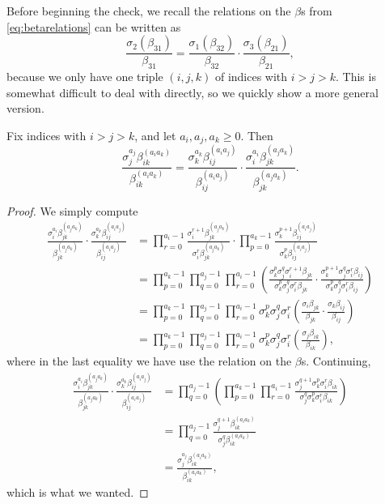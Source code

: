 \documentclass{article}
\numberwithin{equation}{section}
\begin{document}
Before beginning the check, we recall the relations on the $\beta$s from \autoref{eq:betarelations} can be written as
\[\frac{\sigma_2(\beta_{31})}{\beta_{31}}=\frac{\sigma_1(\beta_{32})}{\beta_{32}}\cdot\frac{\sigma_3(\beta_{21})}{\beta_{21}},\]
because we only have one triple $(i,j,k)$ of indices with $i>j>k$. This is somewhat difficult to deal with directly, so we quickly show a more general version.
\begin{lemma} \label{lem:betterbetarelation}
	Fix indices with $i>j>k$, and let $a_i,a_j,a_k\ge0$. Then
	\[\frac{\sigma_j^{a_j}\beta_{ik}^{(a_ia_k)}}{\beta_{ik}^{(a_ia_k)}}=\frac{\sigma_k^{a_k}\beta_{ij}^{(a_ia_j)}}{\beta_{ij}^{(a_ia_j)}}\cdot\frac{\sigma_i^{a_i}\beta_{jk}^{(a_ja_k)}}{\beta_{jk}^{(a_ja_k)}}.\]
\end{lemma}
\begin{proof}
	We simply compute
	\begin{align*}
		\frac{\sigma_i^{a_i}\beta_{jk}^{(a_ja_k)}}{\beta_{jk}^{(a_ja_k)}}\cdot\frac{\sigma_k^{a_k}\beta_{ij}^{(a_ia_j)}}{\beta_{ij}^{(a_ia_j)}} &= \prod_{r=0}^{a_i-1}\frac{\sigma_i^{r+1}\beta_{jk}^{(a_ja_k)}}{\sigma_i^r\beta_{jk}^{(a_ja_k)}}\cdot\prod_{p=0}^{a_k-1}\frac{\sigma_k^{p+1}\beta_{ij}^{(a_ia_j)}}{\sigma_k^p\beta_{ij}^{(a_ia_j)}} \\
		&= \prod_{p=0}^{a_k-1}\prod_{q=0}^{a_j-1}\prod_{r=0}^{a_i-1}\left(\frac{\sigma_k^p\sigma_j^q\sigma_i^{r+1}\beta_{jk}}{\sigma_k^p\sigma_j^q\sigma_i^r\beta_{jk}}\cdot\frac{\sigma_k^{p+1}\sigma_j^q\sigma_i^r\beta_{ij}}{\sigma_k^p\sigma_j^q\sigma_i^r\beta_{ij}}\right) \\
		&= \prod_{p=0}^{a_k-1}\prod_{q=0}^{a_j-1}\prod_{r=0}^{a_i-1}\sigma_k^p\sigma_j^q\sigma_i^r\left(\frac{\sigma_i\beta_{jk}}{\beta_{jk}}\cdot\frac{\sigma_k\beta_{ij}}{\beta_{ij}}\right) \\
		&= \prod_{p=0}^{a_k-1}\prod_{q=0}^{a_j-1}\prod_{r=0}^{a_i-1}\sigma_k^p\sigma_j^q\sigma_i^r\left(\frac{\sigma_j\beta_{ik}}{\beta_{ik}}\right),
	\end{align*}
	where in the last equality we have use the relation on the $\beta$s. Continuing,
	\begin{align*}
		\frac{\sigma_i^{a_i}\beta_{jk}^{(a_ja_k)}}{\beta_{jk}^{(a_ja_k)}}\cdot\frac{\sigma_k^{a_k}\beta_{ij}^{(a_ia_j)}}{\beta_{ij}^{(a_ia_j)}} &= \prod_{q=0}^{a_j-1}\left(\prod_{p=0}^{a_k-1}\prod_{r=0}^{a_i-1}\frac{\sigma_j^{q+1}\sigma_k^p\sigma_i^r\beta_{ik}}{\sigma_j^q\sigma_k^p\sigma_i^r\beta_{ik}}\right) \\
		&= \prod_{q=0}^{a_j-1}\frac{\sigma_j^{q+1}\beta_{ik}^{(a_ia_k)}}{\sigma_j^q\beta_{ik}^{(a_ia_k)}} \\
		&= \frac{\sigma_j^{a_j}\beta_{ik}^{(a_ia_k)}}{\beta_{ik}^{(a_ia_k)}},
	\end{align*}
	which is what we wanted.
\end{proof}
\end{document}
